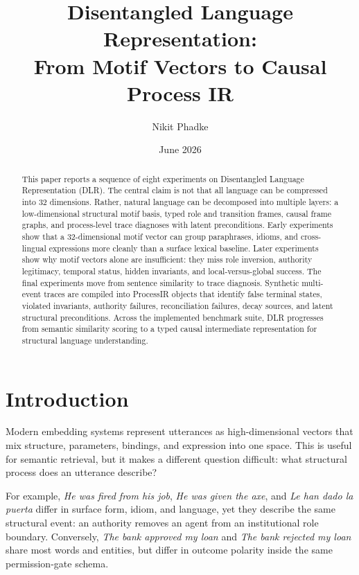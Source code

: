 \documentclass[11pt]{article}
\title{\textbf{Disentangled Language Representation:}\\
From Motif Vectors to Causal Process IR}
\author{Nikit Phadke}
\date{June 2026}
\begin{document}
\maketitle

\begin{abstract}
This paper reports a sequence of eight experiments on Disentangled Language
Representation (DLR). The central claim is not that all language can be
compressed into 32 dimensions. Rather, natural language can be decomposed into
multiple layers: a low-dimensional structural motif basis, typed role and
transition frames, causal frame graphs, and process-level trace diagnoses with
latent preconditions. Early experiments show that a 32-dimensional motif vector
can group paraphrases, idioms, and cross-lingual expressions more cleanly than a
surface lexical baseline. Later experiments show why motif vectors alone are
insufficient: they miss role inversion, authority legitimacy, temporal status,
hidden invariants, and local-versus-global success. The final experiments move
from sentence similarity to trace diagnosis. Synthetic multi-event traces are
compiled into ProcessIR objects that identify false terminal states, violated
invariants, authority failures, reconciliation failures, decay sources, and
latent structural preconditions. Across the implemented benchmark suite, DLR
progresses from semantic similarity scoring to a typed causal intermediate
representation for structural language understanding.
\end{abstract}

\section{Introduction}

Modern embedding systems represent utterances as high-dimensional vectors that
mix structure, parameters, bindings, and expression into one space. This is
useful for semantic retrieval, but it makes a different question difficult:
what structural process does an utterance describe?

For example, \emph{He was fired from his job}, \emph{He was given the axe}, and
\emph{Le han dado la puerta} differ in surface form, idiom, and language, yet
they describe the same structural event: an authority removes an agent from an
institutional role boundary. Conversely, \emph{The bank approved my loan} and
\emph{The bank rejected my loan} share most words and entities, but differ in
outcome polarity inside the same permission-gate schema.
\end{document}
